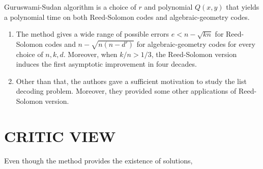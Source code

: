 \documentclass{article}
\begin{document}
Guruswami-Sudan algorithm is a choice of $r$ and polynomial $Q(x, y)$ that yields a polynomial time on both Reed-Solomon codes and algebraic-geometry codes.

\begin{enumerate}
    \item The method gives a wide range of possible errors $e < n - \sqrt{kn}$ for Reed-Solomon codes and $n - \sqrt{n(n-d')}$ for algebraic-geometry codes for every choice of $n, k, d$. Moreover, when $k/n > 1/3$, the Reed-Solomon version induces the first asymptotic improvement in four decades.

    \item Other than that, the authors gave a sufficient motivation to study the list decoding problem. Moreover, they provided some other applications of Reed-Solomon version.
\end{enumerate}




\pagebreak
\section{CRITIC VIEW}

Even though the method provides the existence of solutions,
\end{document}
